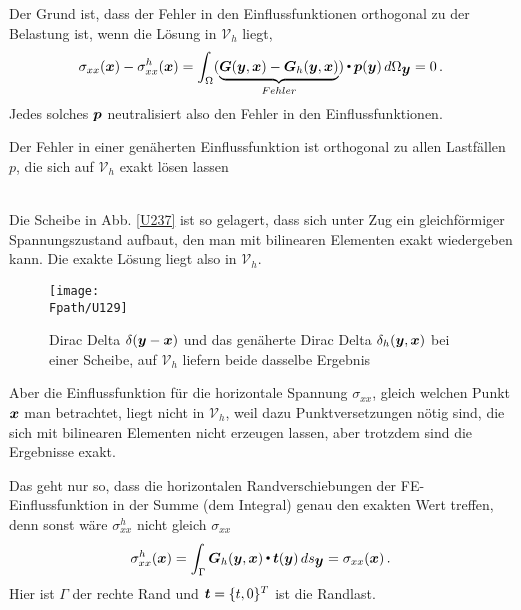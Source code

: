 {Der Grund ist, dass der Fehler in den Einflussfunktionen orthogonal zu der Belastung ist, wenn die L\"{o}sung in $\mathcal{V}_h$ liegt,
\begin{align}
\sigma_{xx}(\mbox{\boldmath $x$}) - \sigma_{xx}^h(\mbox{\boldmath $x$})= \int_{\Omega} (\underbrace{\mbox{\boldmath $G$}(\mbox{\boldmath $y$},\mbox{\boldmath $x$}) - \mbox{\boldmath $G$}_h(\mbox{\boldmath $y$},\mbox{\boldmath $x$})}_{Fehler}){\,\scriptscriptstyle \stackrel{\bullet}{{}}}\, \mbox{\boldmath $p$}(\mbox{\boldmath $y$})\,d\Omega_{\mbox{\boldmath $y$}} = 0\,.
\end{align}
Jedes solches $\mbox{\boldmath $p$}$ \glq neutralisiert\grq{} also den Fehler in den Einflussfunktionen.\\

\hspace*{-12pt}\colorbox{highlightBlue}{\parbox{0.98\textwidth}{Der Fehler in einer gen\"{a}herten Einflussfunktion ist orthogonal zu allen Lastf\"{a}llen $p$, die sich auf $\mathcal{V}_h$ exakt l\"{o}sen lassen}}\\

Die Scheibe in Abb. \ref{U237} ist so gelagert, dass sich unter Zug ein gleichf\"{o}rmiger Spannungszustand aufbaut, den man mit bilinearen Elementen  exakt wiedergeben kann. Die  exakte L\"{o}sung liegt also in $\mathcal{V}_h $.
\begin{figure}[tbp]
\centering
\if {} \sidecaption \fi
\texttt{[image: \\Fpath/U129]}
\caption{Dirac Delta $\delta(\mbox{\boldmath $y$}- \mbox{\boldmath $x$})$ und das gen\"{a}herte Dirac Delta $\delta_h(\mbox{\boldmath $y$}, \mbox{\boldmath $x$})$ bei einer Scheibe, auf $\mathcal{V}_h$ liefern beide dasselbe Ergebnis } \label{U129}
\end{figure}%

Aber die Einflussfunktion f\"{u}r die horizontale Spannung $ \sigma_{xx} $, gleich welchen Punkt $\mbox{\boldmath $x$}$ man betrachtet, liegt nicht in $\mathcal{V}_h $, weil dazu Punktversetzungen n\"{o}tig sind, die sich mit bilinearen Elementen nicht erzeugen lassen, aber trotzdem sind die Ergebnisse exakt.

Das geht nur so, dass die horizontalen Randverschiebungen der FE-Einflussfunktion in der Summe (dem Integral) genau den exakten Wert treffen, denn sonst w\"{a}re $\sigma_{xx}^h$ nicht gleich $\sigma_{xx}$
\begin{align}
\sigma_{xx}^h(\mbox{\boldmath $x$}) = \int_{\Gamma} \mbox{\boldmath $G$}_h(\mbox{\boldmath $y$},\mbox{\boldmath $x$}) {\,\scriptscriptstyle \stackrel{\bullet}{{}}}\, \mbox{\boldmath $t$}(\mbox{\boldmath $y$})\,ds_{\mbox{\boldmath $y$}} = \sigma_{xx}(\mbox{\boldmath $x$})\,.
\end{align}
Hier ist $\Gamma$ der rechte Rand und $\mbox{\boldmath $t$} = \{t,0\}^T$ ist die Randlast.\\

}
